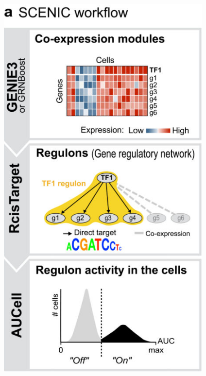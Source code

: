 \documentclass[11pt]{ctexbeamer}
\begin{document}
\begin{frame}
\begin{columns}
\begin{figure}
\hspace{-1.8em}\includegraphics[width=\textwidth]{scRNA_scenic_01.png}
\end{figure}
    \end{columns}
\end{frame}
\end{document}
